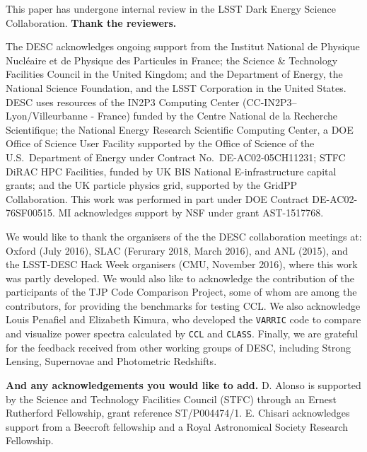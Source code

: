 %
This paper has undergone internal review in the LSST Dark Energy Science Collaboration. {\bf Thank the reviewers.}

The DESC acknowledges ongoing support from the Institut National de Physique Nucl\'eaire et de Physique des Particules in France; the Science \& Technology Facilities Council in the United Kingdom; and the Department of Energy, the National Science Foundation, and the LSST Corporation in the United States.  DESC uses resources of the IN2P3 Computing Center (CC-IN2P3--Lyon/Villeurbanne - France) funded by the Centre National de la Recherche Scientifique; the National Energy Research Scientific Computing Center, a DOE Office of Science User Facility supported by the Office of Science of the U.S.\ Department of Energy under Contract No.\ DE-AC02-05CH11231; STFC DiRAC HPC Facilities, funded by UK BIS National E-infrastructure capital grants; and the UK particle physics grid, supported by the GridPP Collaboration.  This work was performed in part under DOE Contract DE-AC02-76SF00515. MI acknowledges support by NSF under grant AST-1517768.

We would like to thank the organisers of the the DESC collaboration meetings at: Oxford (July 2016), SLAC (Ferurary 2018, March 2016), and ANL (2015), and the LSST-DESC Hack Week organisers (CMU, November 2016), where this work 
was partly developed. We would also like to acknowledge the contribution of the participants of the TJP Code Comparison Project, some of whom are among the \ccl contributors, for providing the benchmarks for testing CCL. We also acknowledge Louis Penafiel and Elizabeth Kimura, who developed the {\tt VARRIC} code to compare and visualize power spectra calculated by {\tt CCL} and {\tt CLASS}. Finally, we are grateful for the feedback received from other working groups of DESC, including Strong Lensing, Supernovae and Photometric Redshifts.

%
{\bf And any acknowledgements you would like to add.}
D. Alonso is supported by the Science and Technology Facilities Council (STFC) through an Ernest Rutherford Fellowship, grant reference ST/P004474/1.
E. Chisari acknowledges support from a Beecroft fellowship and a Royal Astronomical Society Research Fellowship. 
